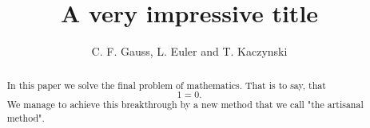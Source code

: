 \documentclass[12pt]{article}
\begin{document}
\def\A{\mathbb{A}}
\def\B{\mathbf{B}}
\def \C{\mathbb{C}}
\def \F{\mathbb{F}}
\def \K{\mathbb{K}}

\def \Z{\mathbb{Z}}
\def \P{\mathbb{P}}
\def \R{\mathbb{R}}
\def \Q{\mathbb{Q}}
\def \N{\mathbb{N}}
\def \Z{\mathbb{Z}}

\def\B{\mathcal B}
\def\e{\varepsilon}

\def\cA{{\mathcal A}}
\def\cB{{\mathcal B}}
\def\cC{{\mathcal C}}
\def\cD{{\mathcal D}}
\def\cE{{\mathcal E}}
\def\cF{{\mathcal F}}
\def\cG{{\mathcal G}}
\def\cH{{\mathcal H}}
\def\cI{{\mathcal I}}
\def\cJ{{\mathcal J}}
\def\cK{{\mathcal K}}
\def\cL{{\mathcal L}}
\def\cM{{\mathcal M}}
\def\cN{{\mathcal N}}
\def\cO{{\mathcal O}}
\def\cP{{\mathcal P}}
\def\cQ{{\mathcal Q}}
\def\cR{{\mathcal R}}
\def\cS{{\mathcal S}}
\def\cT{{\mathcal T}}
\def\cU{{\mathcal U}}
\def\cV{{\mathcal V}}
\def\cW{{\mathcal W}}
\def\cX{{\mathcal X}}
\def\cY{{\mathcal Y}}
\def\cZ{{\mathcal Z}}

\def\f{\frac{|\A||B|}{|G|}}
\def\AB{|\A\cap B|}
\def \Fq{\F_q}
\def \Fqn{\F_{q^n}}

\def\({\left(}
\def\){\right)}
\def\fl#1{\left\lfloor#1\right\rfloor}
\def\rf#1{\left\lceil#1\right\rceil}
\def\Res{{\mathrm{Res}}}

\newcommand{\comm}[1]{\marginpar{
\vskip-\baselineskip \raggedright\footnotesize
\itshape\hrule\smallskip#1\par\smallskip\hrule}}

\newtheorem{lem}{Lemma}
\newtheorem{lemma}[lem]{Lemma}
\newtheorem{prop}{Proposition}
\newtheorem{proposition}[prop]{Proposition }
\newtheorem{thm}{Theorem}
\newtheorem{theorem}[thm]{Theorem}
\newtheorem{cor}{Corollary}
\newtheorem{corollary}[cor]{Corollary}
\newtheorem{prob}{Problem}
\newtheorem{problem}[prob]{Problem}
\newtheorem{ques}{Question}
\newtheorem{question}[ques]{Question}
\newtheorem{rem}{Remark}

\title{A very impressive title}

\author{ {\sc C. F. Gauss}, {\sc L. Euler} and {\sc T. Kaczynski} }

\date{}

\maketitle

\begin{abstract}
In this paper we solve the final problem of mathematics. That is to say, that 
$$
1= 0.
$$
We manage to achieve this breakthrough by a new method that we call "the artisanal method".
\end{abstract}
\end{document}
